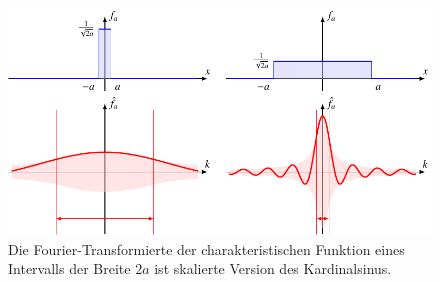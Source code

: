 %
%
%
\begin{figure}
\centering
\includegraphics{chapters/030-gruppen/images/sinc.pdf}
\caption{Die Fourier-Transformierte der charakteristischen Funktion
eines Intervalls der Breite $2a$ ist skalierte Version des
Kardinalsinus.
\label{buch:gruppen:fourier:fig:sinc}}
\end{figure}

